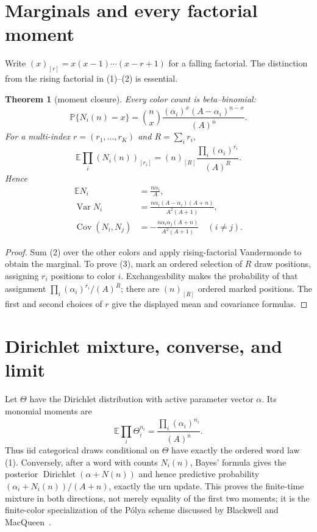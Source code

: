 \documentclass[10pt]{article}
\newtheorem{theorem}{Theorem}
\newcommand{\Prb}{\mathbb P}
\newcommand{\E}{\mathbb E}
\begin{document}
\section{Marginals and every factorial moment}
Write $(x)_{[r]}=x(x-1)\cdots(x-r+1)$ for a falling factorial.  The
distinction from the rising factorial in (1)--(2) is essential.
\begin{theorem}[moment closure]
Every color count is beta--binomial:
\[
 \Prb\{N_i(n)=x\}=\binom nx
 \frac{(\alpha_i)^{\overline x}(A-\alpha_i)^{\overline{n-x}}}
 {(A)^{\overline n}}.
\]
For a multi-index $r=(r_1,\ldots,r_K)$ and $R=\sum_i r_i$,
\begin{equation}
 \E\prod_i(N_i(n))_{[r_i]}
 =(n)_{[R]}\frac{\prod_i(\alpha_i)^{\overline{r_i}}}
 {(A)^{\overline R}}.                                  \tag{3}
\end{equation}
Hence
\begin{align*}
 \E N_i&=\frac{n\alpha_i}{A},\\
 \operatorname{Var}N_i&=
 \frac{n\alpha_i(A-\alpha_i)(A+n)}{A^2(A+1)},\\
 \operatorname{Cov}(N_i,N_j)&=
 -\frac{n\alpha_i\alpha_j(A+n)}{A^2(A+1)}\quad(i\ne j).
\end{align*}
\end{theorem}
\begin{proof}
Sum (2) over the other colors and apply rising-factorial Vandermonde to
obtain the marginal.  To prove (3), mark an ordered selection of $R$ draw
positions, assigning $r_i$ positions to color $i$.  Exchangeability makes the
probability of that assignment
$\prod_i(\alpha_i)^{\overline{r_i}}/(A)^{\overline R}$;
there are $(n)_{[R]}$ ordered marked positions.  The first and second choices
of $r$ give the displayed mean and covariance formulas.
\end{proof}

\section{Dirichlet mixture, converse, and limit}
Let $\Theta$ have the Dirichlet distribution with active parameter vector
$\alpha$.  Its monomial moments are
\begin{equation}
 \E\prod_i\Theta_i^{n_i}
 =\frac{\prod_i(\alpha_i)^{\overline{n_i}}}{(A)^{\overline n}}. \tag{4}
\end{equation}
Thus iid categorical draws conditional on $\Theta$ have exactly the ordered
word law (1).  Conversely, after a word with counts $N_i(n)$, Bayes' formula
gives the posterior $\operatorname{Dirichlet}(\alpha+N(n))$ and hence
predictive probability $(\alpha_i+N_i(n))/(A+n)$, exactly the urn update.
This proves the finite-time mixture in both directions, not merely equality
of the first two moments; it is the finite-color specialization of the
P\'olya scheme discussed by Blackwell and MacQueen~\cite{BM}.
\end{document}
